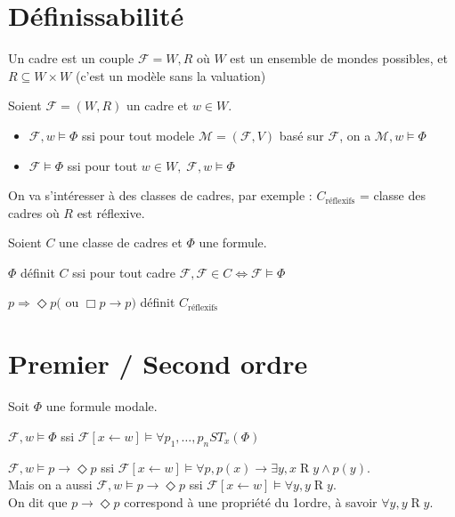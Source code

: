 \documentclass[10pt,a4paper]{article}
\newcommand{\F}{\mathcal{F}}
\newcommand{\M}{\mathcal{M}}
\DeclareMathOperator{\Ro}{R}
\begin{document}
\section{Définissabilité}

\begin{definition}[cadre]
 Un cadre est un couple $\F = W, R$ où $W$ est un ensemble de mondes possibles, et $R \subseteq W \times W$
(c'est un modèle sans la valuation)
\end{definition}

\begin{definition}
 Soient $\F = (W,R)$ un cadre et $w \in W$.
\begin{itemize}
 \item $\F, w \models \Phi$ ssi pour tout modele $\M = (\F, V)$ basé sur $\F$, on a $\M,w \models \Phi$
 \item $\F \models \Phi$ ssi pour tout $w \in W, \; \F, w \models \Phi$
\end{itemize}
\end{definition}
On va s'intéresser à des classes de cadres,  par exemple : 
$C_{\text{réflexifs}}$ = classe des cadres où $R$ est réflexive.

\begin{definition}
 Soient $C$ une classe de cadres et $\Phi$ une formule.

$\Phi$ définit $C$ ssi pour tout cadre $\F,\F \in C \Leftrightarrow \F \models \Phi$
\end{definition}

\begin{ex}
 $p \Rightarrow \Diamond p ($ ou $\Box p \rightarrow p)$ définit $C_{\text{réflexifs}}  $
\end{ex}


\section{Premier / Second ordre}

\begin{prop}
 Soit $\Phi$ une formule modale.

$\F,w \models \Phi$ ssi $\F[x \leftarrow w] \models \forall p_1, \dots, p_n ST_x (\Phi)$
\end{prop}

\begin{ex}
 $\F,w \models p \rightarrow \Diamond p$ ssi $\F[x \leftarrow w] \models \forall p, p(x)  \rightarrow \exists y, x   \Ro y \wedge p(y)$.\\
Mais on a aussi $\F,w \models p  \rightarrow \Diamond p$ ssi $\F[x \leftarrow w] \models \forall y , y   \Ro y$.\\
On dit que $p \rightarrow \Diamond p$ correspond à une propriété du 1\ier ordre, à savoir $\forall y , y   \Ro y$.
\end{ex}
\end{document}
